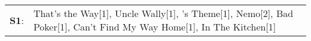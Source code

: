 \begin{supertabular}{p{0.03\textwidth}p{0.92\textwidth}}
 \textbf{S1}:  &  That's the Way[1]\textsuperscript{}, \enspace Uncle Wally[1]\textsuperscript{}, 's Theme[1]\textsuperscript{}, \enspace Nemo[2]\textsuperscript{}, \enspace Bad Poker[1]\textsuperscript{}, \enspace Can't Find My Way Home[1]\textsuperscript{}, \enspace In The Kitchen[1]\textsuperscript{}  \enspace  \\
\end{supertabular}
